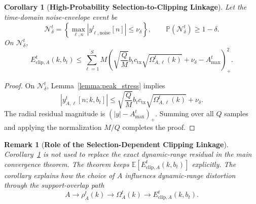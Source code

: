\documentclass[journal]{IEEEtran}
\newtheorem{corollary}{Corollary}
\newtheorem{remark}{Remark}
\begin{document}
\begin{corollary}[\bf High-Probability Selection-to-Clipping Linkage]
    \label{cor:clipping_linkage}
    Let the time-domain noise-envelope event be
    \begin{equation}
        \mathcal{N}_{\delta}^{t}
        =\left\{\max_{\ell,n}|y_{\ell,\mathrm{noise}}^t[n]|\le\nu_\delta\right\},
        \qquad
        \mathbb{P}(\mathcal{N}_{\delta}^{t})\ge 1-\delta.
    \end{equation}
    On $\mathcal{N}_{\delta}^{t}$,
    \begin{equation}
        E_{\mathrm{clip},A}^{t}(k,b_t)
        \le
        \sum_{\ell=1}^{S}M
        \left(
        \sqrt{\frac{Q}{M}}b_tc_{\mathrm{tx}}\sqrt{\Omega_{A,\ell}^{t}(k)}+
        \nu_\delta-A_{\max}^t
        \right)_+^2.
    \end{equation}
\end{corollary}
\begin{proof}
    On $\mathcal{N}_{\delta}^{t}$, Lemma~\ref{lemma:peak_stress} implies
    \begin{equation}
        |y_{A,\ell}^t[n;k,b_t]|
        \le
        \sqrt{\frac{Q}{M}}b_tc_{\mathrm{tx}}\sqrt{\Omega_{A,\ell}^{t}(k)}+\nu_\delta.
    \end{equation}
    The radial residual magnitude is $(|y|-A_{\max}^t)_+$. Summing over all $Q$ samples and applying the normalization $M/Q$ completes the proof.
\end{proof}

\begin{remark}[\bf Role of the Selection-Dependent Clipping Linkage]
    Corollary~\ref{cor:clipping_linkage} is not used to replace the exact dynamic-range residual in the main convergence theorem. The theorem keeps $\mathbb{E}[E_{\mathrm{clip},A}^{t}(k,b_t)]$ explicitly. The corollary explains how the choice of $A$ influences dynamic-range distortion through the support-overlap path
    \begin{equation}
        A\rightarrow \rho_A^t(k)\rightarrow\Omega_A^t(k)\rightarrow E_{\mathrm{clip},A}^{t}(k,b_t).
    \end{equation}
\end{remark}
\end{document}
